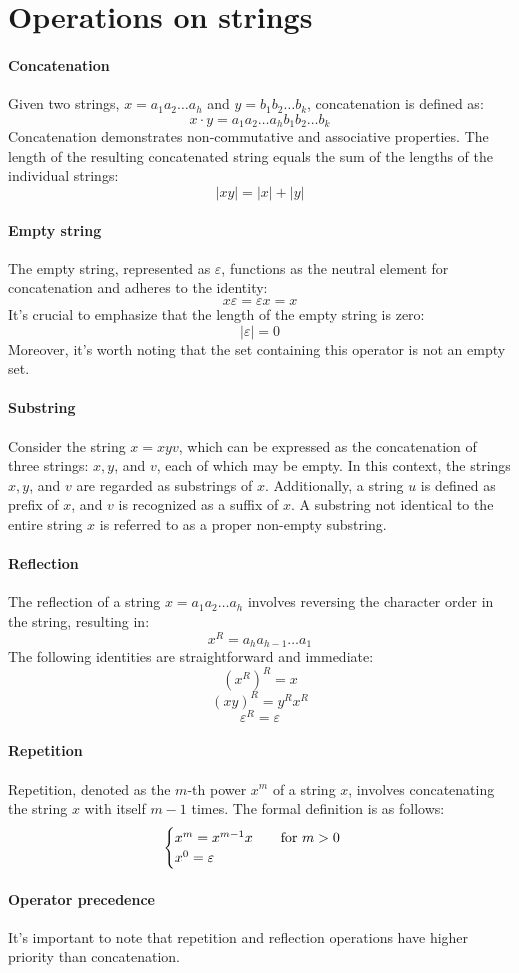\section{Operations on strings}

\paragraph*{Concatenation}
Given two strings, $x=a_1a_2\dots a_h$ and $y=b_1b_2\dots b_k$, concatenation is defined as:
\[x\cdot y=a_1a_2\dots a_h b_1b_2\dots b_k\]
Concatenation demonstrates non-commutative and associative properties. 
The length of the resulting concatenated string equals the sum of the lengths of the individual strings:
\[\left\lvert xy \right\rvert = \left\lvert x \right\rvert + \left\lvert y \right\rvert\]

\paragraph*{Empty string}
The empty string, represented as $\varepsilon$, functions as the neutral element for concatenation and adheres to the identity:
\[x\varepsilon=\varepsilon x=x\]
It's crucial to emphasize that the length of the empty string is zero:
\[\left\lvert \varepsilon \right\rvert = 0\]
Moreover, it's worth noting that the set containing this operator is not an empty set.

\paragraph*{Substring}
Consider the string $x=xyv$, which can be expressed as the concatenation of three strings: $x,y$, and $v$, each of which may be empty.
In this context, the strings $x, y$, and $v$ are regarded as substrings of $x$. 
Additionally, a string $u$ is defined as prefix of $x$, and $v$ is recognized as a suffix of $x$. 
A substring not identical to the entire string $x$ is referred to as a proper non-empty substring.

\paragraph*{Reflection}
The reflection of a string $x=a_1a_2\dots a_h$ involves reversing the character order in the string, resulting in:
\[x^R=a_ha_{h-1}\dots a_1\]
The following identities are straightforward and immediate:
\[(x^R)^R=x\]
\[(xy)^R=y^Rx^R\]
\[\varepsilon^R=\varepsilon\]

\paragraph*{Repetition}
Repetition, denoted as the $m$-th power $x^m$ of a string $x$, involves concatenating the string $x$ with itself $m-1$ times. 
The formal definition is as follows:
\[\begin{cases}
    x^m=x^{m-1}x \qquad \textnormal{for } m > 0 \\
    x^0=\varepsilon
\end{cases}\]

\paragraph*{Operator precedence}
It's important to note that repetition and reflection operations have higher priority than concatenation.